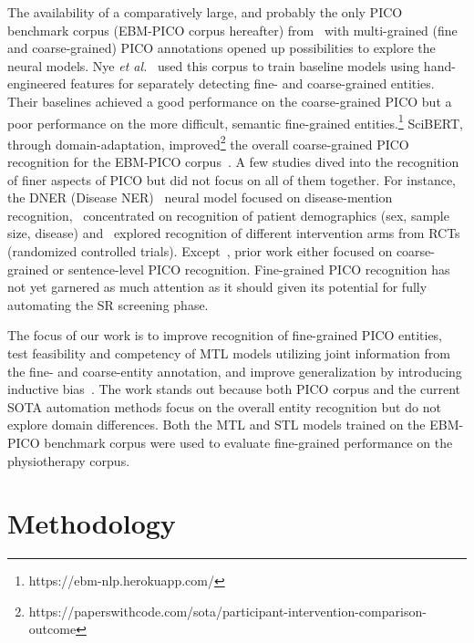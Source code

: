 \documentclass[runningheads]{llncs}
\begin{document}
The availability of a comparatively large, and probably the only PICO benchmark corpus (EBM-PICO corpus hereafter) from~\cite{nye2018corpus} with multi-grained (fine and coarse-grained) PICO annotations opened up possibilities to explore the neural models.
Nye \textit{et al.}~\cite{nye2018corpus} used this corpus to train baseline models using hand-engineered features for separately detecting fine- and coarse-grained entities.
Their baselines achieved a good performance on the coarse-grained PICO but a poor performance on the more difficult, semantic fine-grained entities.\footnote{https://ebm-nlp.herokuapp.com/}
SciBERT, through domain-adaptation, improved\footnote{https://paperswithcode.com/sota/participant-intervention-comparison-outcome} the overall coarse-grained PICO recognition for the EBM-PICO corpus~\cite{beltagy2019scibert}.
A few studies dived into the recognition of finer aspects of PICO but did not focus on all of them together.
For instance, the DNER (Disease NER)~\cite{zhang2020unlocking} neural model focused on disease-mention recognition,~\cite{xu2007extracting} concentrated on recognition of patient demographics (sex, sample size, disease) and~\cite{chung2009towards} explored recognition of different intervention arms from RCTs (randomized controlled trials).
Except~\cite{nye2018corpus}, prior work either focused on coarse-grained or sentence-level PICO recognition.
Fine-grained PICO recognition has not yet garnered as much attention as it should given its potential for fully automating the SR screening phase.

The focus of our work is to improve recognition of fine-grained PICO entities, test feasibility and competency of MTL models utilizing joint information from the fine- and coarse-entity annotation, and improve generalization by introducing inductive bias~\cite{caruana1997multitask}.
The work stands out because both PICO corpus and the current SOTA automation methods focus on the overall entity recognition but do not explore domain differences.
Both the MTL and STL models trained on the EBM-PICO benchmark corpus were used to evaluate fine-grained performance on the physiotherapy corpus. 
%
\section{Methodology}
\label{sec:methodology}
%
%
\end{document}
